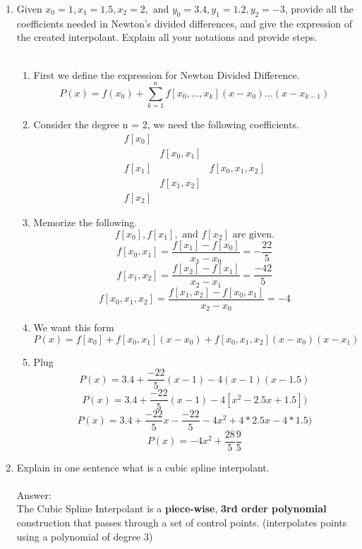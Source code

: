 \documentclass{article}
\begin{document}
\begin{enumerate}
\begin{enumerate}
        \color{black}
        
        \item Given $x_0 = 1, x_1 = 1.5, x_2 = 2, \text{ and } y_0 = 3.4, y_1 = 1.2, y_2 = -3$, provide all the coefficients needed in Newton’s divided differences, and give the expression of the created interpolant. Explain all your notations and provide steps.\\
        \\
        \color{red}
            \begin{enumerate}
                \item First we define the expression for Newton Divided Difference. 
                $$ P(x) = f(x_0) + \sum_{k=1}^{n}f[x_0, \dots, x_k](x-x_0) \dots(x-x_{k-1}) $$
                \item Consider the degree n = 2, we need the following coefficients. 
                \[
            \begin{array}{cccccc}
            f[x_0] \\
                &       f[x_0, x_1] \\
            f[x_1] &             & f[x_0, x_1, x_2]\\
                &       f[x_1, x_2] \\
            f[x_2]
            \end{array}
            \]
            \item Memorize the following. 
            $$ f[x_0], f[x_1], \text{ and } f[x_2] \text{ are given.} $$
            $$ f[x_0, x_1] = \frac{f[x_1]-f[x_0]}{x_1-x_0} = -\frac{22}{5} $$
            $$ f[x_1, x_2] = \frac{f[x_2] - f[x_1]}{x_2 - x_1} = \frac{-42}{5} $$
            $$ f[x_0, x_1, x_2] = \frac{f[x_1, x_2] - f[x_0, x_1]}{x_2 - x_0} = -4 $$
            \item We want this form 
            $$ P(x) = f[x_0] + f[x_0, x_1](x-x_0) + f[x_0, x_1, x_2](x-x_0)(x-x_1) $$
            \item Plug $$ P(x) = 3.4 + \frac{-22}{5}(x - 1) - 4(x-1)(x - 1.5) $$
            $$ P(x) = 3.4 + \frac{-22}{5}(x - 1) - 4[x^2 -2.5x + 1.5]) $$
            $$ P(x) = 3.4 + \frac{-22}{5}x - \frac{-22}{5} - 4x^2 + 4*2.5x - 4*1.5)$$
            $$ P(x) = - 4x^2 + \frac{28}{5} \frac{9}{5}$$

            \end{enumerate}
            
            
        \color{black}
        
        \item Explain in one sentence what is a cubic spline interpolant.\\
        \\
        \color{red}
            Answer:\\
            The Cubic Spline Interpolant is a \textbf{piece-wise}, \textbf{3rd order polynomial} construction that passes through a set of control points. (interpolates points using a polynomial of degree 3)
        \color{black}
    \end{enumerate}
    

\end{enumerate}
\end{document}
